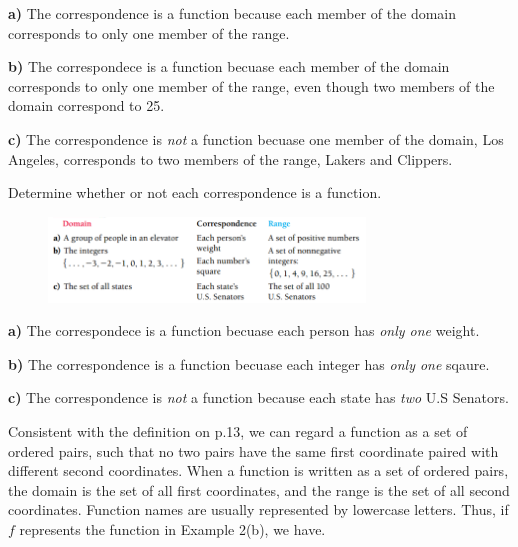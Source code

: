 \documentclass{report}
\begin{document}
\vspace{3mm}

\noindent \textbf{a)} The correspondence is a function because each member of the domain corresponds to only one member of the range.
\vspace{3mm}

\noindent \textbf{b)} The correspondece is a function becuase each member of the domain corresponds to only one member of the range, even though two members of the domain correspond to 25.
\vspace{3mm}

\noindent \textbf{c)} The correspondence is \textit{not} a function becuase one member of the domain, Los Angeles, corresponds to two members of the range, Lakers and Clippers.
\bigbreak \noindent \bigbreak \noindent
\ex{} {
  \vspace{3mm}

  Determine whether or not each correspondence is a function.
}
\vspace{2mm}

\begin{figure}[ht]
\centering
\includegraphics[width=0.75\textwidth]{ example2.png }
\end{figure}
\bigbreak \noindent
{}

\noindent \textbf{a)} The correspondece is a function becuase each person has \textit{only one} weight.
\vspace{3mm}

\noindent \textbf{b)} The correspondence is a function becuase each integer has \textit{only one} sqaure.
\vspace{3mm}

\noindent \textbf{c)} The correspondence is \textit{not} a function because each state has \textit{two} U.S Senators.

\bigbreak \noindent \bigbreak \noindent
Consistent with the definition on p.13, we can regard a function as a set of ordered pairs, such that no two pairs have the same first coordinate paired with different second coordinates. When a function is written as a set of ordered pairs, the domain is the set of all first coordinates, and the range is the set of all second coordinates. Function names are usually represented by lowercase letters. Thus, if $f$ represents the function in Example 2(b), we have.
\vspace{3mm}
\end{document}
